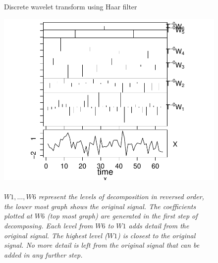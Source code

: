\begin{figure}[H]
\caption{Discrete wavelet transform using Haar
filter}\label{figure:haar_transform}
\caption*{\\[0em]\footnotesize\textit{$W1, \ldots, W6$ represent the levels of
decomposition in reversed order, the lower most graph shows the original
signal. The coefficients plotted at $W6$ (top most graph) are generated in the
first step of decomposing. Each level from $W6$ to $W1$ adds detail from the
original signal. The highest level ($W1$) is closest to the original signal. No
more detail is left from the original signal that can be added in any further
step.}\\[1em]}
\centering
	\includegraphics[scale=0.9]{images/dwt_haar.pdf}
\end{figure}
